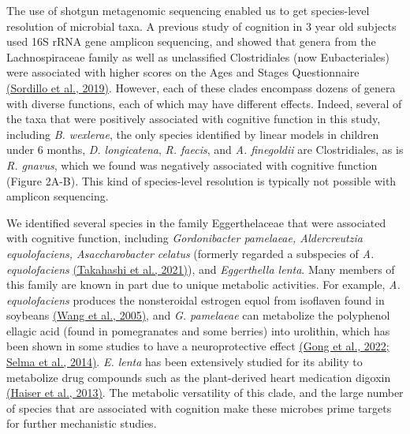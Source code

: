 \documentclass[
]{article}
\begin{document}
The use of shotgun metagenomic sequencing enabled us to get
species-level resolution of microbial taxa. A previous study of
cognition in 3 year old subjects used 16S rRNA gene amplicon sequencing,
and showed that genera from the Lachnospiraceae family as well as
unclassified Clostridiales (now Eubacteriales) were associated with
higher scores on the Ages and Stages Questionnaire
\href{https://www.zotero.org/google-docs/?SB5Lwa}{(Sordillo et al.,
2019)}. However, each of these clades encompass dozens of genera with
diverse functions, each of which may have different effects. Indeed,
several of the taxa that were positively associated with cognitive
function in this study, including \emph{B. wexlerae}, the only species
identified by linear models in children under 6 months, \emph{D.
longicatena}, \emph{R. faecis}, and \emph{A. finegoldii} are
Clostridiales, as is \emph{R. gnavus}, which we found was negatively
associated with cognitive function (Figure 2A-B). This kind of
species-level resolution is typically not possible with amplicon
sequencing.

We identified several species in the family Eggerthelaceae that were
associated with cognitive function, including \emph{Gordonibacter
pamelaeae, Aldercreutzia equolofaciens, Asaccharobacter celatus}
(formerly regarded a subspecies of \emph{A. equolofaciens}
\href{https://www.zotero.org/google-docs/?OEhguI}{(Takahashi et al.,
2021)}), and \emph{Eggerthella lenta}. Many members of this family are
known in part due to unique metabolic activities. For example, \emph{A.
equolofaciens} produces the nonsteroidal estrogen equol from isoflaven
found in soybeans
\href{https://www.zotero.org/google-docs/?I2qNyB}{(Wang et al., 2005)},
and \emph{G. pamelaeae} can metabolize the polyphenol ellagic acid
(found in pomegranates and some berries) into urolithin, which has been
shown in some studies to have a neuroprotective effect
\href{https://www.zotero.org/google-docs/?oTN8Lw}{(Gong et al., 2022;
Selma et al., 2014)}. \emph{E. lenta} has been extensively studied for
its ability to metabolize drug compounds such as the plant-derived heart
medication digoxin
\href{https://www.zotero.org/google-docs/?tH2Qeq}{(Haiser et al.,
2013)}. The metabolic versatility of this clade, and the large number of
species that are associated with cognition make these microbes prime
targets for further mechanistic studies.
\end{document}
